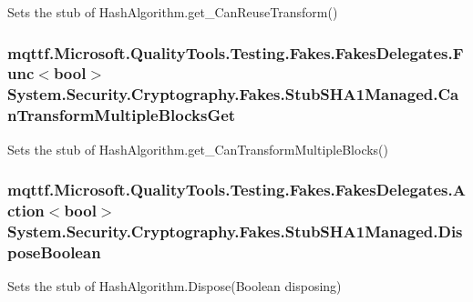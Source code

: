 Sets the stub of Hash\-Algorithm.\-get\-\_\-\-Can\-Reuse\-Transform()

\hypertarget{class_system_1_1_security_1_1_cryptography_1_1_fakes_1_1_stub_s_h_a1_managed_af7476cd104a4e512e95cbaad6040983c}{
\subsubsection[{Can\-Transform\-Multiple\-Blocks\-Get}]{\setlength{\rightskip}{0pt plus 5cm}mqttf.\-Microsoft.\-Quality\-Tools.\-Testing.\-Fakes.\-Fakes\-Delegates.\-Func$<$bool$>$ System.\-Security.\-Cryptography.\-Fakes.\-Stub\-S\-H\-A1\-Managed.\-Can\-Transform\-Multiple\-Blocks\-Get}}\label{class_system_1_1_security_1_1_cryptography_1_1_fakes_1_1_stub_s_h_a1_managed_af7476cd104a4e512e95cbaad6040983c}


Sets the stub of Hash\-Algorithm.\-get\-\_\-\-Can\-Transform\-Multiple\-Blocks()

\hypertarget{class_system_1_1_security_1_1_cryptography_1_1_fakes_1_1_stub_s_h_a1_managed_a5d33018264b82db61fba0f3c8ce2f230}{
\subsubsection[{Dispose\-Boolean}]{\setlength{\rightskip}{0pt plus 5cm}mqttf.\-Microsoft.\-Quality\-Tools.\-Testing.\-Fakes.\-Fakes\-Delegates.\-Action$<$bool$>$ System.\-Security.\-Cryptography.\-Fakes.\-Stub\-S\-H\-A1\-Managed.\-Dispose\-Boolean}}\label{class_system_1_1_security_1_1_cryptography_1_1_fakes_1_1_stub_s_h_a1_managed_a5d33018264b82db61fba0f3c8ce2f230}


Sets the stub of Hash\-Algorithm.\-Dispose(\-Boolean disposing)


